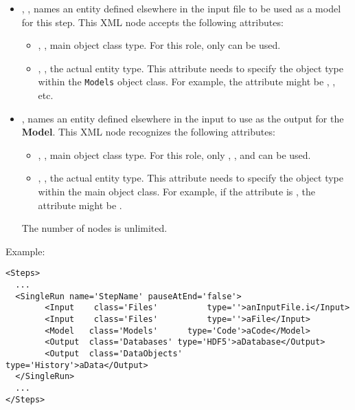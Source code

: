 \begin{itemize}
\item {}, , names an entity
defined elsewhere in the input file to be used as a model for this step.
This XML node accepts the following attributes:
\begin{itemize}
  \item {}, , main object class
    type.
    For this role, only  can be used.
  \item {}, , the actual entity
    type.
    This attribute needs to specify the object type within the \texttt{Models}
    object class.
    For example, the  attribute might be , 
    , etc.
\end{itemize}
\item {},  names an entity
defined elsewhere in the input to use as the output for the \textbf{Model}.
This XML node recognizes the following attributes:
\begin{itemize}
  \item {}, , main object class
    type.
    For this role, only , , and 
     can be used.
  \item {}, , the actual entity
    type.
    This attribute needs to specify the object type within the main object
    class.
    For example, if the   attribute is , the 
     attribute might be .
\end{itemize}
\nb The number of  nodes is unlimited.
\end{itemize}

Example:
\begin{lstlisting}[style=XML,morekeywords={class,pauseAtEnd}]
<Steps>
  ...
  <SingleRun name='StepName' pauseAtEnd='false'> 
        <Input    class='Files'          type=''>anInputFile.i</Input>
        <Input    class='Files'          type=''>aFile</Input>
        <Model   class='Models'      type='Code'>aCode</Model>
        <Output  class='Databases' type='HDF5'>aDatabase</Output>
        <Output  class='DataObjects'        type='History'>aData</Output>
  </SingleRun>
  ...
</Steps>
\end{lstlisting}
